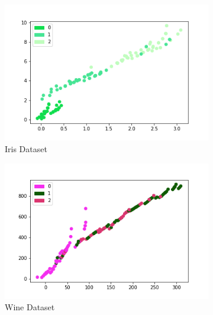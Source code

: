 \documentclass[11pt, a4paper]{article}
\begin{document}
    
    \begin{figure}[h]
        \centering
        \begin{subfigure}[b]{0.3\textwidth}
            \centering
            \includegraphics[width=\textwidth]{iris_euclidian_distance_1.png}
            \caption{Iris Dataset}
            \label{iris_euclid}
        \end{subfigure}
        \hfill
        \begin{subfigure}[b]{0.3\textwidth}
            \centering
            \includegraphics[width=\textwidth]{wine_euclidian_distance_1.png}
            \caption{Wine Dataset}
            \label{wine_euclid}
        \end{subfigure}
        \hfill
        \begin{subfigure}[b]{0.3\textwidth}
            \centering

\end{subfigure}
\end{figure}
\end{document}
